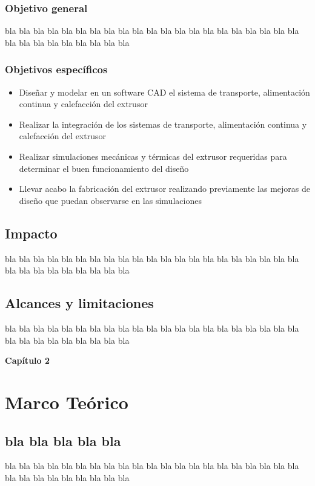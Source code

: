 \documentclass[12pt]{article}
\begin{document}
\subsubsection{Objetivo general}
bla bla bla bla bla bla bla bla bla bla bla bla bla bla bla bla bla bla bla bla bla bla bla bla bla bla bla bla bla bla
\subsubsection{Objetivos específicos}
\begin{itemize}
\item Diseñar y modelar en un software CAD el sistema de transporte, alimentación continua y calefacción del extrusor
\item Realizar la integración de los sistemas de transporte, alimentación continua y calefacción del extrusor
\item Realizar simulaciones mecánicas y térmicas del extrusor requeridas para determinar el buen funcionamiento del diseño
\item Llevar acabo la fabricación del extrusor realizando previamente las mejoras de diseño que puedan observarse en las simulaciones 
\end{itemize}

\subsection{Impacto}
bla bla bla bla bla bla bla bla bla bla bla bla bla bla bla bla bla bla bla bla bla bla bla bla bla bla bla bla bla bla

\subsection{Alcances y limitaciones}
bla bla bla bla bla bla bla bla bla bla bla bla bla bla bla bla bla bla bla bla bla bla bla bla bla bla bla bla bla bla


\newpage


{\huge \bf Capítulo 2}
\section{\Large Marco Teórico}

\subsection{bla bla bla bla bla}

bla bla bla bla bla bla bla bla bla bla bla bla bla bla bla bla bla bla bla bla bla bla bla bla bla bla bla bla bla bla
\vspace*{0.3cm}
\end{document}
